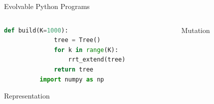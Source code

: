 \documentclass[aspectratio=169]{beamer}
\begin{document}
\begin{frame}{Evolvable Python Programs}
  \begin{columns}[T]
      \begin{column}{.5\linewidth}
      \begin{lstlisting}[language=Python]
          def build(K=1000):
              tree = Tree()
              for k in range(K):
                  rrt_extend(tree)
              return tree
          import numpy as np
      \end{lstlisting}
      Representation
      \end{column}
      \begin{column}{.5\linewidth}
      Mutation
      \end{column}
  \end{columns}
\end{frame}
\end{document}
